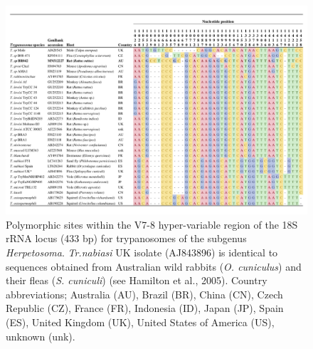 \documentclass[a4paper, nobind]{templates/ociamthesis}
\begin{document}
\begin{figure}
\includegraphics[width=0.95\linewidth]{figures/ms-figs/Ch5-Fig2} \caption[Nucleotide alignment of \textit{Trypanosoma lewisi} clade.]{Polymorphic sites within the V7-8 hyper-variable region of the 18S rRNA locus (433 bp) for trypanosomes of the subgenus \textit{Herpetosoma}. \textit{Tr.nabiasi} UK isolate (AJ843896) is identical to sequences obtained from Australian wild rabbits (\textit{O. cuniculus}) and their fleas (\textit{S. cuniculi}) (see Hamilton et al., 2005). Country abbreviations; Australia (AU), Brazil (BR), China (CN), Czech Republic (CZ), France (FR), Indonesia (ID), Japan (JP), Spain (ES), United Kingdom (UK), United States of America (US), unknown (unk).}\label{fig:F52}
\end{figure}
\end{document}
